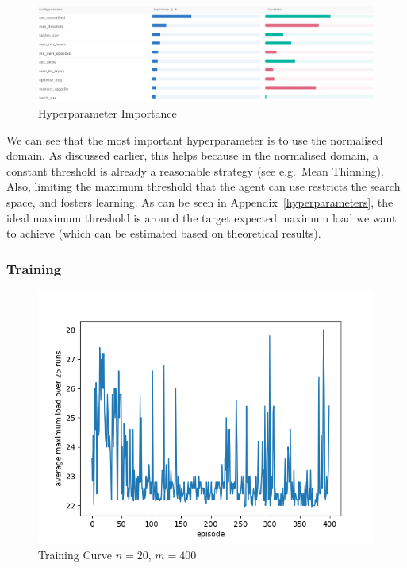\begin{figure}[h] \label{two-thinning-hyperparameter-importance}
    \centering
    \includegraphics[scale=0.4]{Chapter4/Figs/Hyperparameter_importance_20_400.png}
    \caption{\TwoThinning Hyperparameter Importance \cite{biewald2020wandb}}
\end{figure}
We can see that the most important hyperparameter is to use the normalised domain. As discussed earlier, this helps because in the normalised domain, a constant threshold is already a reasonable strategy (see e.g.\ Mean Thinning). Also, limiting the maximum threshold that the agent can use restricts the search space, and fosters learning. As can be seen in Appendix~\ref{hyperparameters}, the ideal maximum threshold is around the target expected maximum load we want to achieve (which can be estimated based on theoretical results).



\subsubsection{Training}


\begin{figure}[h] \label{two-thinning-training-curve}
    \centering
    \includegraphics[scale=0.6]{Chapter4/Figs/training_progression_20_400.png}
    \caption{\TwoThinning Training Curve $n=20$, $m=400$}
\end{figure}

